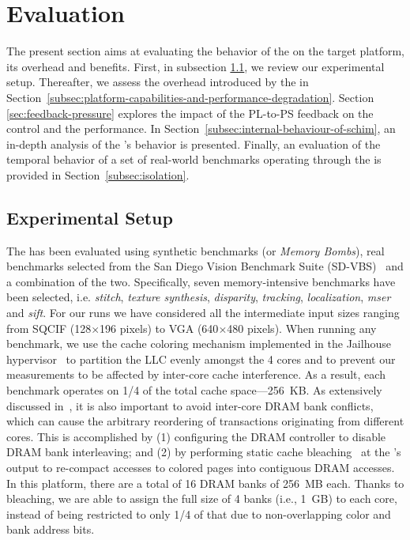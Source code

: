 \section{Evaluation}

The present section aims at evaluating the behavior of the \schim on
the target platform, its overhead and benefits.  First, in subsection
\ref{subsection:considered-architecture}, we review our experimental
setup. Thereafter, we assess the overhead introduced by the \schim in
Section~\ref{subsec:platform-capabilities-and-performance-degradation}.
Section \ref{sec:feedback-pressure} explores the impact of the PL-to-PS feedback
on the control and the performance.
In Section~\ref{subsec:internal-behaviour-of-schim}, an in-depth analysis
of the \schim's behavior is presented. Finally, an evaluation of the
temporal behavior of a set of real-world benchmarks operating through
the \schim is provided in Section~\ref{subsec:isolation}.


\subsection{Experimental Setup}
\label{subsection:considered-architecture}
The \schim has been evaluated using synthetic benchmarks (or
\emph{Memory Bombs}), real benchmarks selected from the San Diego
Vision Benchmark Suite (SD-VBS)~\cite{SD-VBS} and a combination of
the two. Specifically, seven memory-intensive benchmarks have
been selected, i.e. \emph{stitch}, \emph{texture synthesis},
\emph{disparity}, \emph{tracking}, \emph{localization}, \emph{mser}
and \emph{sift}. For our runs we have considered all the intermediate
input sizes ranging from SQCIF (128$\times$196 pixels) to VGA
(640$\times$480 pixels). When running any benchmark, we use the cache
coloring mechanism implemented in the Jailhouse
hypervisor~\cite{determ_virt} to partition the LLC evenly amongst the
4 cores and to prevent our measurements to be affected by inter-core
cache interference. As a result, each benchmark operates on 1/4 of the
total cache space---256~KB. As extensively discussed
in~\cite{bounding_rtas14, palloc_rtas14}, it is also important to
avoid inter-core DRAM bank conflicts, which can cause the arbitrary
reordering of transactions originating from different cores. This is
accomplished by (1) configuring the DRAM controller to disable DRAM
bank interleaving; and (2) by performing static cache
bleaching~\cite{gracioli2019designing, PLIM20} at the \schim's output
to re-compact accesses to colored pages into contiguous DRAM
accesses. In this platform, there are a total of 16 DRAM banks of
256~MB each. Thanks to bleaching, we are able to assign the full size
of 4 banks (i.e., 1~GB) to each core, instead of being restricted
to only 1/4 of that due to non-overlapping color and bank address
bits.

